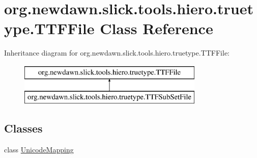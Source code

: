 \hypertarget{classorg_1_1newdawn_1_1slick_1_1tools_1_1hiero_1_1truetype_1_1_t_t_f_file}{}\section{org.\+newdawn.\+slick.\+tools.\+hiero.\+truetype.\+T\+T\+F\+File Class Reference}
\label{classorg_1_1newdawn_1_1slick_1_1tools_1_1hiero_1_1truetype_1_1_t_t_f_file}
Inheritance diagram for org.\+newdawn.\+slick.\+tools.\+hiero.\+truetype.\+T\+T\+F\+File\+:\begin{figure}[H]
\begin{center}
\leavevmode
\includegraphics[height=2.000000cm]{classorg_1_1newdawn_1_1slick_1_1tools_1_1hiero_1_1truetype_1_1_t_t_f_file}
\end{center}
\end{figure}
\subsection*{Classes}
\begin{DoxyCompactItemize}
\item 
class \mbox{\hyperlink{classorg_1_1newdawn_1_1slick_1_1tools_1_1hiero_1_1truetype_1_1_t_t_f_file_1_1_unicode_mapping}{Unicode\+Mapping}}
\end{DoxyCompactItemize}
